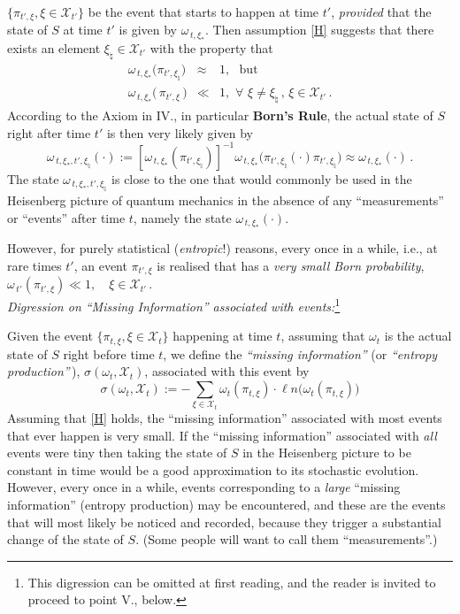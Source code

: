 \documentclass[a4paper,11pt]{article}
\begin{document}
\mbox{$\lbrace \pi_{t', \xi}, \xi \in \mathcal{X}_{t'} \rbrace$} be the event that starts to happen at time $t'$, \textit{provided} that the state of $S$ at time $t'$ is given by $\omega_{\,t, \xi_{*}}$. Then assumption \eqref{H} suggests that there exists an element 
$\xi_{\natural}\in \mathcal{X}_{t'}$ with the property that 
\begin{eqnarray} \label{Continuity}
\omega_{\,t, \xi_{*}}\big(\pi_{t', \xi_{\natural}}\big) &\approx & 1, \,\,\text{ but }\nonumber \\
\omega_{\,t, \xi_{*}}\big(\,\pi_{t', \xi}\,\big) &\ll& 1, \,\,\forall\,\, \xi \not= \xi_{\natural}\,,\,\xi \in \mathcal{X}_{t'}\,.
\end{eqnarray}
According to the Axiom in IV., in particular {\bf{Born's Rule}}, the actual state of $S$ right after time $t'$ is then very likely given by 
$$\omega_{\,t, \xi_{*}, t',\xi_{\natural}}(\cdot) := [\omega_{\,t, \xi_{*}}(\pi_{t', \xi_{\natural}})]^{-1}\omega_{\,t, \xi_{*}}\big(\pi_{t', \xi_{\natural}} (\cdot) \pi_{t', \xi_{\natural}}\big) \approx \omega_{\,t, \xi_{*}}(\cdot)\,.$$
The state $\omega_{\,t, \xi_{*}, t',\xi_{\natural}}$ is close to the one that would commonly be used in the Heisenberg picture of quantum mechanics in the absence of any ``measurements'' or ``events'' after time $t$, namely the state 
$\omega_{\,t, \xi_{*}}(\cdot)$.

However, for purely statistical (\textit{entropic}!) reasons, every once in a while, i.e., at rare times $t'$, an event $\pi_{t',\xi}$ is realised that has a \textit{very small Born probability}, $\omega_{\,t'}(\pi_{t',\xi}) \ll 1,    \quad \xi \in \mathcal{X}_{t'}\,.$\\

\textit{Digression on ``Missing Information'' associated with events:}\footnote{This digression can be omitted at first reading, and the reader is invited to proceed to point V., below.}

Given the event $\lbrace \pi_{t,\xi}, \xi \in \mathcal{X}_{t} \rbrace$ happening at time $t$, assuming that $\omega_{t}$ is the actual state of $S$ right before time $t$, we define the \textit{``missing information''} (or \textit{``entropy production''}\,), $\sigma(\omega_{t}, \mathcal{X}_{t})$, associated with this event by
\begin{equation}\label{entropy}
\sigma(\omega_{t}, \mathcal{X}_{t}):= - \sum_{\xi \in \mathcal{X}_{t}} \omega_{t}(\pi_{t,\xi})\cdot \ell n\big( \omega_{t}(\pi_{t,\xi})\big)
\end{equation}
Assuming that \eqref{H} holds, the ``missing information'' associated with most events that ever happen is very small. If the ``missing information'' associated with \textit{all} events were tiny then taking the state of $S$ in the Heisenberg picture to be constant in time would be a good approximation to its stochastic evolution. However, every once in a while, events corresponding to a \textit{large} ``missing information'' (entropy production) may be encountered, and these are the events that will most likely be noticed and recorded, because they trigger a substantial change of the state of $S$. (Some people will want to call them ``measurements''.)
\end{document}
